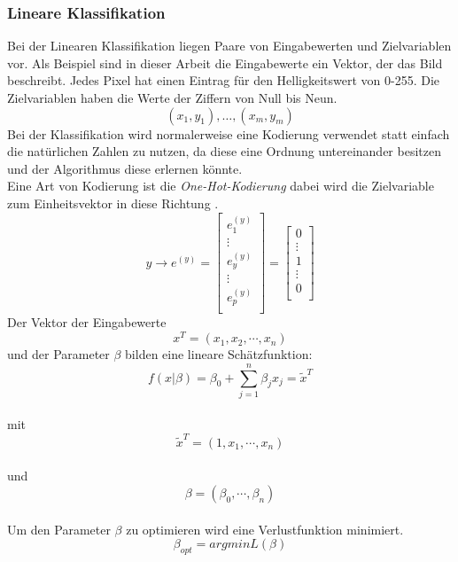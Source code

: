 \subsubsection{Lineare Klassifikation}
Bei der Linearen Klassifikation liegen Paare von Eingabewerten und Zielvariablen vor.  Als Beispiel sind in dieser Arbeit die Eingabewerte ein Vektor,  der das Bild beschreibt.  Jedes Pixel hat einen Eintrag für den Helligkeitswert von 0-255.  Die Zielvariablen haben die Werte der Ziffern von Null bis Neun. \\
\[{(x_{1} , y_{1}),  \dotso , (x_{m}, y_{m})}\]
Bei der Klassifikation wird normalerweise eine Kodierung verwendet statt einfach die natürlichen Zahlen zu nutzen, da diese eine Ordnung untereinander besitzen und der Algorithmus diese erlernen könnte.\\
Eine Art von Kodierung ist die \emph{One-Hot-Kodierung} dabei wird die Zielvariable zum Einheitsvektor in diese Richtung \cite{Choo_2020}.
\begin{equation}
y \rightarrow e^{(y)} = 
\begin{bmatrix}
e_{1}^{(y)} \\
 \vdots\\
  e_{y}^{(y)}\\
   \vdots \\
    e_{p}^{(y)} \\ 
\end{bmatrix} 
=
 \begin{bmatrix}
 0\\
  \vdots \\
   1 \\
    \vdots \\
     0 \\
\end{bmatrix}
\end{equation}
Der Vektor der Eingabewerte \[x^{T} = (x_{1}, x_{2}, \cdots, x_{n})\] und der Parameter $\beta$ bilden eine lineare Schätzfunktion:\\
\begin{equation}
f(x|\beta) = \beta_{0} + \sum_{ j= 1}^{n} \beta_{j} x_{j} =\tilde{x}^{T}
\end{equation}\\
mit \[\tilde{x}^{T} = (1,x_{1}, \cdots, x_{n})\] \\ und \[ \beta = (\beta_{0}, \cdots, \beta_{n})\] \\
Um den Parameter $ \beta$ zu optimieren wird eine Verlustfunktion minimiert.\\
\begin{equation}
\beta_{opt} = argmin L(\beta)
\end{equation}\\
